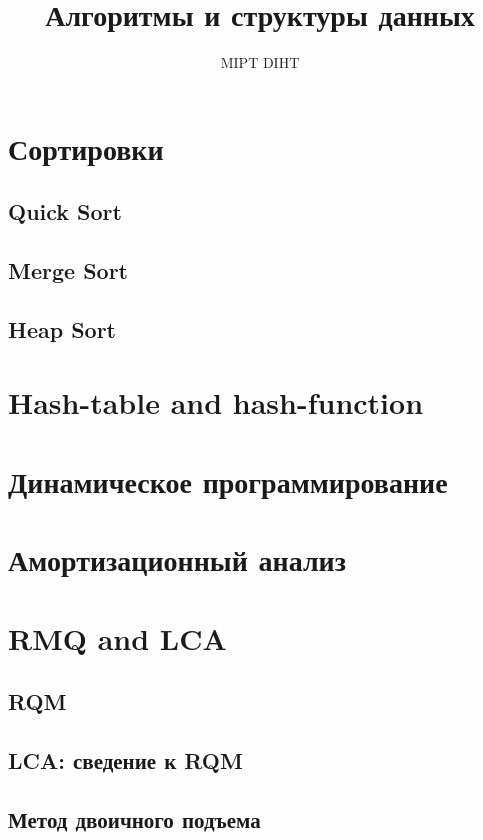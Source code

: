 \documentclass[a4paper]{article}
\title{Алгоритмы и структуры данных}
\author{MIPT DIHT}
\begin{document}
\maketitle

\section{Сортировки}
\subsection{Quick Sort}
\subsection{Merge Sort}
\subsection{Heap Sort}

\section{Hash-table and hash-function}
\label{sec:section_name}

\section{Динамическое программирование}
\label{sec:section_name}
\label{Общая идея. Линейная и матричная динамика. Динамика на отрезках}


\section{Амортизационный анализ}

\section{RMQ and LCA}
\subsection{RQM}
\subsection{LCA: сведение к RQM}
\subsection{Метод двоичного подъема}
\end{document}
